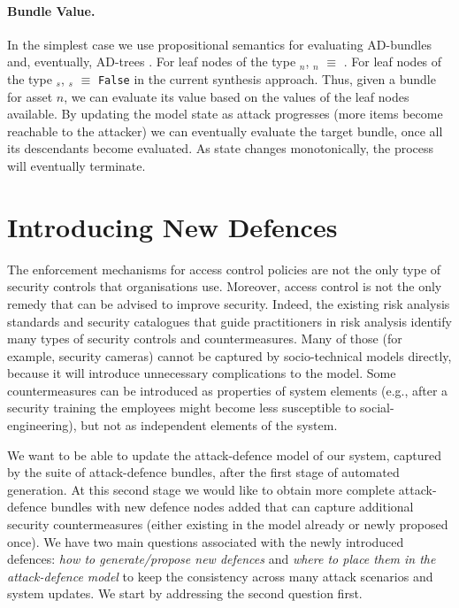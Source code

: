 \documentclass{llncs}
\begin{document}
\paragraph{Bundle Value.}
In the simplest case we use propositional semantics for evaluating AD-bundles and, eventually, AD-trees \cite{Kordy-JLC-2014}. For leaf nodes of the type \taccess$_n$, \taccess$_n$ $\equiv$ . For leaf nodes of the type \tbreak$_s$, \tbreak$_s$ $\equiv$ \texttt{False} in the current synthesis approach. Thus, given a bundle for asset $n$, we can evaluate its value based on the values of the leaf nodes available. By updating the model state as attack progresses (more items become reachable to the attacker) we can eventually evaluate the target bundle, once all its descendants become evaluated. As state changes monotonically, the process will eventually terminate.







\section{Introducing New Defences}\label{sec:2ndstep}
The enforcement mechanisms for access control policies are not the only type of security controls that organisations use. Moreover, access control is not the only remedy that can be advised to improve security. Indeed, the existing risk analysis standards and security catalogues that guide practitioners in risk analysis identify many types of security controls and countermeasures. Many of those (for example, security cameras) cannot be captured by socio-technical models directly, because it will introduce unnecessary complications to the model. Some countermeasures can be introduced as properties of system elements (e.g., after a security training the employees might become less susceptible to social-engineering), but not as independent elements of the system. 

We want to be able to update the attack-defence model of our system, captured by the suite of attack-defence bundles, after the first stage of automated generation. At this second stage we would like to obtain more complete attack-defence bundles with new defence nodes added that can capture additional security countermeasures (either existing in the model already or newly proposed once). We have two main questions associated with the newly introduced defences: \emph{how to generate/propose new defences} and \emph{where to place them in the attack-defence model} to keep the consistency across many attack scenarios and system updates. We start by addressing the second question first.
\end{document}

